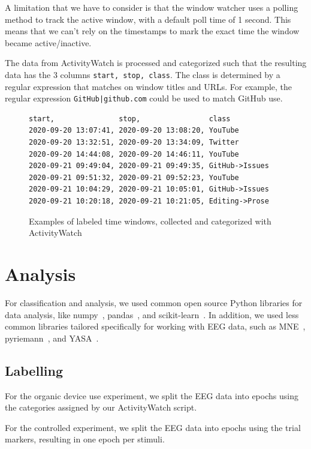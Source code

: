         A limitation that we have to consider is that the window watcher uses a polling method to track the active window, with a default poll time of 1 second. This means that we can't rely on the timestamps to mark the exact time the window became active/inactive.

        The data from ActivityWatch is processed and categorized such that the resulting data has the 3 columns \texttt{start, stop, class}. The class is determined by a regular expression that matches on window titles and URLs. For example, the regular expression \texttt{GitHub|github.com} could be used to match GitHub use.

\begin{figure}[h]
\begin{verbatim}
start,               stop,                class
2020-09-20 13:07:41, 2020-09-20 13:08:20, YouTube
2020-09-20 13:32:51, 2020-09-20 13:34:09, Twitter
2020-09-20 14:44:08, 2020-09-20 14:46:11, YouTube
2020-09-21 09:49:04, 2020-09-21 09:49:35, GitHub->Issues
2020-09-21 09:51:32, 2020-09-21 09:52:23, YouTube
2020-09-21 10:04:29, 2020-09-21 10:05:01, GitHub->Issues
2020-09-21 10:20:18, 2020-09-21 10:21:05, Editing->Prose
\end{verbatim}
    \caption{Examples of labeled time windows, collected and categorized with ActivityWatch}\label{code:class-csv}
\end{figure}

\pagebreak
\section{Analysis}

    For classification and analysis, we used common open source Python libraries for data analysis, like numpy~\cite{harris2020array}, pandas~\cite{reback2020pandas}, and scikit-learn~\cite{scikit-learn}. In addition, we used less common libraries tailored specifically for working with EEG data, such as MNE~\cite{noauthor_mne-python_2020}, pyriemann~\cite{alexandre_barachant_2020_3715511}, and YASA~\cite{vallat_yasa_2020}.

    \subsection{Labelling}
        For the organic device use experiment, we split the EEG data into epochs using the categories assigned by our ActivityWatch script.

        For the controlled experiment, we split the EEG data into epochs using the trial markers, resulting in one epoch per stimuli.

